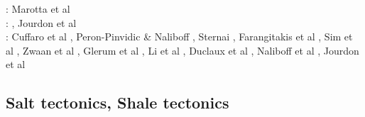 \begin{scriptsize}
\twothousandeighteen: 
\cite{chsm18}\cite{brwm18}\cite{brun18}\cite{tebu18}\cite{jebu18}\cite{sahf18}\cite{pesn18}
      \cite{mord18}\cite{webe18}\cite{webe18b}\cite{gebu18} Marotta et al \cite{marc18}\\
\twothousandnineteen: \cite{lisp19}\cite{zwsb19}\cite{anpa19}\cite{dual19}\cite{mocb19}\cite{chmd19}\cite{thhu19}
      \cite{jala19}\cite{hooi19}\cite{lapk19}, Jourdon et al \cite{jolm19}\\
\twothousandtwenty: Cuffaro et al \cite{cump20}, Peron-Pinvidic \& Naliboff \cite{pena20}, Sternai \cite{ster20},
Farangitakis et al \cite{fahm20}, Sim et al \cite{siss20}, Zwaan et al \cite{zwsr20}, Glerum et al \cite{glbs20},
Li et al \cite{lial20}, Duclaux et al \cite{duhm20}, Naliboff et al \cite{nagb20}, Jourdon et al \cite{jolm20}
\end{scriptsize}


\subsection{Salt tectonics, Shale tectonics}

